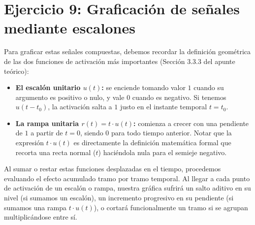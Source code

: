 \documentclass[10pt,a4paper]{article}
\begin{document}
	\section*{Ejercicio 9: Graficación de señales mediante escalones}
	
	Para graficar estas señales compuestas, debemos recordar la definición geométrica de las dos funciones de activación más importantes (Sección 3.3.3 del apunte teórico):
	\begin{itemize}
		\item \textbf{El escalón unitario $u(t)$:} se enciende tomando valor $1$ cuando su argumento es positivo o nulo, y vale $0$ cuando es negativo. Si tenemos $u(t-t_0)$, la activación salta a $1$ justo en el instante temporal $t=t_0$.
		\item \textbf{La rampa unitaria $r(t) = t \cdot u(t)$:} comienza a crecer con una pendiente de $1$ a partir de $t=0$, siendo $0$ para todo tiempo anterior. Notar que la expresión $t \cdot u(t)$ es directamente la definición matemática formal que recorta una recta normal ($t$) haciéndola nula para el semieje negativo.
	\end{itemize}

	Al sumar o restar estas funciones desplazadas en el tiempo, procedemos evaluando el efecto acumulado tramo por tramo temporal. Al llegar a cada punto de activación de un escalón o rampa, nuestra gráfica sufrirá un salto aditivo en su nivel (si sumamos un escalón), un incremento progresivo en su pendiente (si sumamos una rampa $t \cdot u(t)$), o cortará funcionalmente un tramo si se agrupan multiplicándose entre sí.
	
\end{document}
